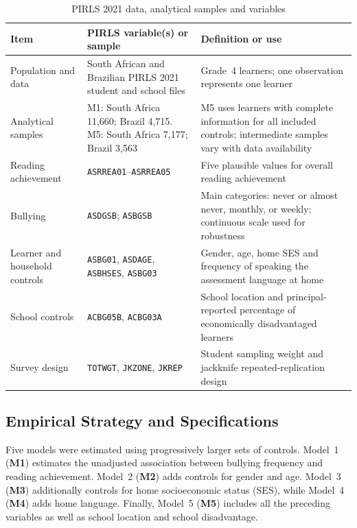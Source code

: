 \begin{table}[!htbp]
    \centering
    \footnotesize
    \setlength{\tabcolsep}{4pt}
    \renewcommand{\arraystretch}{0.9}
    \setlength{\abovecaptionskip}{4pt}
    \setlength{\belowcaptionskip}{2pt}
    \caption{PIRLS 2021 data, analytical samples and variables}
    \label{tab:pirls_data_variables}
    \begin{tabular}{>{\raggedright\arraybackslash}p{2.8cm}>{\raggedright\arraybackslash}p{4.2cm}>{\raggedright\arraybackslash}p{7.4cm}}
        \toprule
        \textbf{Item} & \textbf{PIRLS variable(s) or sample} & \textbf{Definition or use} \\
        \midrule
        Population and data & South African and Brazilian PIRLS 2021 student and school files & Grade~4 learners; one observation represents one learner \\
        Analytical samples & M1: South Africa 11,660; Brazil 4,715. M5: South Africa 7,177; Brazil 3,563 & M5 uses learners with complete information for all included controls; intermediate samples vary with data availability \\
        Reading achievement & \texttt{ASRREA01}--\texttt{ASRREA05} & Five plausible values for overall reading achievement \\
        Bullying & \texttt{ASDGSB}; \texttt{ASBGSB} & Main categories: never or almost never, monthly, or weekly; continuous scale used for robustness \\
        Learner and household controls & \texttt{ASBG01}, \texttt{ASDAGE}, \texttt{ASBHSES}, \texttt{ASBG03} & Gender, age, home SES and frequency of speaking the assessment language at home \\
        School controls & \texttt{ACBG05B}, \texttt{ACBG03A} & School location and principal-reported percentage of economically disadvantaged learners \\
        Survey design & \texttt{TOTWGT}, \texttt{JKZONE}, \texttt{JKREP} & Student sampling weight and jackknife repeated-replication design \\
        \bottomrule
    \end{tabular}
\end{table}


\subsection{Empirical Strategy and Specifications}

Five models were estimated using progressively larger sets of controls.
Model~1 (\textbf{M1}) estimates the unadjusted association between
bullying frequency and reading achievement. Model~2 (\textbf{M2}) adds
controls for gender and age. Model~3 (\textbf{M3}) additionally controls
for home socioeconomic status (SES), while Model~4 (\textbf{M4}) adds
home language. Finally, Model~5 (\textbf{M5}) includes all the preceding
variables as well as school location and school disadvantage.

